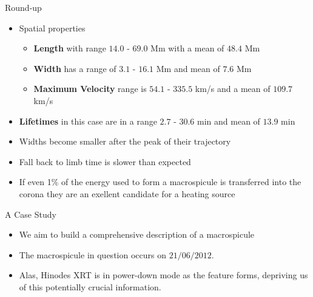 \documentclass{beamer}
\begin{document}
	\begin{frame}{Round-up}
			\begin{itemize}
				\item Spatial properties
				\begin{itemize}
					\item \textbf{Length} with range $14.0$ - $69.0$ Mm with a mean of $48.4$ Mm
					\item \textbf{Width} has a range of $3.1$ - $16.1$ Mm and mean of $7.6$ Mm
					\item \textbf{Maximum Velocity} range is $54.1$ - $335.5$ km/s and a mean of $109.7$ km/s 
				\end{itemize}
				\item \textbf{Lifetimes} in this case are in a range $2.7$ - $30.6$ min and mean of $13.9$ min
				\item{Widths become smaller after the peak of their trajectory}
				\item{Fall back to limb time is slower than expected}
				\item{If even 1\% of the energy used to form a macrospicule is transferred into the corona they are an exellent candidate for a heating source}
	
			\end{itemize}
	\end{frame}
	
	
	

	\begin{frame}{A Case Study}
		\begin{itemize}
			\item{We aim to build a comprehensive description of a macrospicule}
			\item{The macrospicule in question occurs on $21/06/2012$.}			
			\item{Alas, Hinodes XRT is in power-down mode as the feature forms, depriving us of this potentially crucial information.}
		\end{itemize}
	\end{frame}	
	
\end{document}
